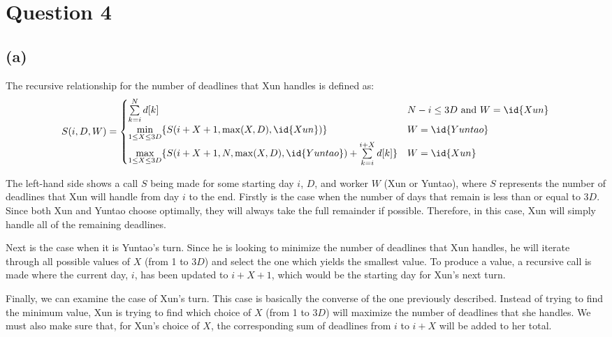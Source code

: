 \section{Question 4}
\subsection{(a)}
The recursive relationship for the number of deadlines that Xun handles is defined as:
\[
    S(i, D, W) = \begin{cases}
        \sum\limits_{k=i}^{N}d[k]                                                                                          & N - i \le 3D \text{ and } W = \id{Xun} \\
        \min\limits_{1 \le X \le 3D} \{S(i + X + 1, \max(X, D), \id{Xun})\}                                             & W = \id{Yuntao} \\
        \max\limits_{1 \le X \le 3D} \{S(i + X + 1, N, \max(X, D), \id{Yuntao}) + \sum\limits_{k=i}^{i + X}d[k]\} & W = \id{Xun}
    \end{cases}
\]


The left-hand side shows a call $S$ being made for some starting day $i$, $D$, and worker $W$ (Xun or Yuntao), where $S$ represents the number of deadlines that Xun will handle from day $i$ to the end.
Firstly is the case when the number of days that remain is less than or equal to $3D$.
Since both Xun and Yuntao choose optimally, they will always take the full remainder if possible.
Therefore, in this case, Xun will simply handle all of the remaining deadlines.

Next is the case when it is Yuntao's turn.
Since he is looking to minimize the number of deadlines that Xun handles, he will iterate through all possible values of $X$ (from 1 to $3D$) and select the one which yields the smallest value.
To produce a value, a recursive call is made where the current day, $i$, has been updated to $i + X + 1$, which would be the starting day for Xun's next turn.

Finally, we can examine the case of Xun's turn.
This case is basically the converse of the one previously described.
Instead of trying to find the minimum value, Xun is trying to find which choice of $X$ (from 1 to $3D$) will maximize the number of deadlines that she handles.
We must also make sure that, for Xun's choice of $X$, the corresponding sum of deadlines from $i$ to $i + X$ will be added to her total.

